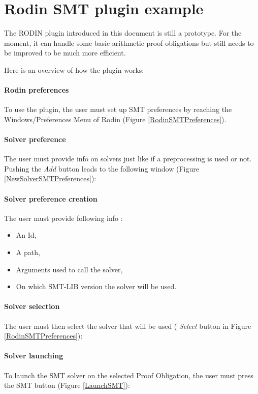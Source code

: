 \section{Rodin SMT plugin example}
The RODIN plugin introduced in this document is still a prototype. For the moment, it can handle some basic arithmetic proof obligations but still needs to be improved to be much more efficient.
 
Here is an overview of how the plugin works:

\paragraph{Rodin preferences}
To use the plugin, the user must set up SMT preferences by reaching the Windows/Preferences Menu of Rodin (Figure \ref{RodinSMTPreferences}).

\paragraph{Solver preference}
The user must provide info on solvers just like if a preprocessing is used or not. Pushing the \textit{Add} button leads to the following window (Figure \ref{NewSolverSMTPreferences}):

\paragraph{Solver preference creation}
The user must provide following info :

\begin{itemize}
\item An Id,
\item A path,
\item Arguments used to call the solver,
\item On which SMT-LIB version the solver will be used.   
\end{itemize}

\paragraph{Solver selection}
The user must then select the solver that will be used ( \textit{Select} button in Figure \ref{RodinSMTPreferences}):

\paragraph{Solver launching}
To launch the SMT solver on the selected Proof Obligation, the user must press the SMT button (Figure \ref{LaunchSMT}):


